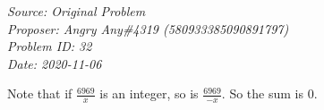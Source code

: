 \SSbreak
\emph{Source: Original Problem}\\
\emph{Proposer:  Angry Any\#4319 (580933385090891797)}\\
\emph{Problem ID: 32}\\
\emph{Date: 2020-11-06}\\
\SSbreak

\bigskip 

\begin{solution}\hfil\medskip

    Note that if $\frac{6969}x$ is an integer, so is $\frac{6969}{-x}$. So the sum is $\boxed{0}$.
\end{solution}\bigskip